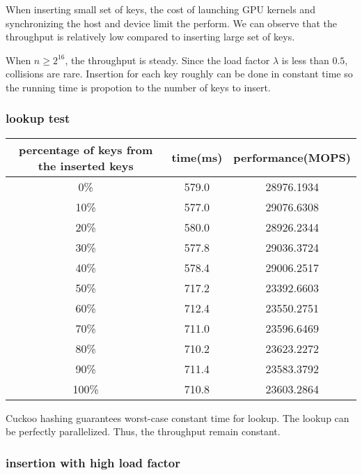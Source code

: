 \documentclass{article}
\begin{document}
When inserting small set of keys, the cost of launching GPU kernels and synchronizing the host and device limit the perform.
We can observe that the throughput is relatively low compared to inserting large set of keys.\par
When $n\geq 2^{16}$, the throughput is steady. Since the load factor $\lambda$ is less than $0.5$, collisions are rare.
Insertion for each key roughly can be done in constant time so the running time is propotion to the number of keys to insert.

\subsubsection*{lookup test}

\begin{tabular}{|c|c|c|}
	\hline
	percentage of keys from the inserted keys & time(ms) & performance(MOPS) \\
	\hline
	0\%                                       & 579.0    & 28976.1934        \\
	10\%                                      & 577.0    & 29076.6308        \\
	20\%                                      & 580.0    & 28926.2344        \\
	30\%                                      & 577.8    & 29036.3724        \\
	40\%                                      & 578.4    & 29006.2517        \\
	50\%                                      & 717.2    & 23392.6603        \\
	60\%                                      & 712.4    & 23550.2751        \\
	70\%                                      & 711.0    & 23596.6469        \\
	80\%                                      & 710.2    & 23623.2272        \\
	90\%                                      & 711.4    & 23583.3792        \\
	100\%                                     & 710.8    & 23603.2864        \\
	\hline
\end{tabular}


Cuckoo hashing guarantees worst-case constant time for lookup.
The lookup can be perfectly parallelized.
Thus, the throughput remain constant.

\subsubsection*{insertion with high load factor}
\end{document}
